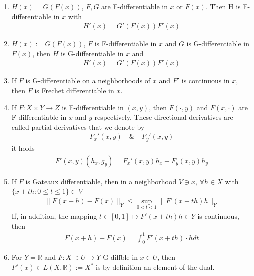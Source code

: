 \begin{enumerate}
	\item $H(x) = G(F(x))$, $F, G$ are F-differentiable in $x$ or $F(x)$. Then H is F-differentiable in $x$ with
		\begin{align*}
			H'(x) = G'(F(x))F'(x)
		\end{align*}
	\item $H(x) := G(F(x))$, $F$ is F-differentiable in $x$ and $G$ is G-differentiable in $F(x)$, then $H$ is G-differentiable in $x$ and 
		\begin{align*}
			H'(x) = G'(F(x)) F'(x)
		\end{align*}
	\item If $F$ is G-differentiable on a neighborhoods of $x$ and $F'$ is continuous in $x$, then $F$ is Frechet differentiable in $x$. 
	\item If $F:X \times Y \rightarrow Z$ is F-differentiable in $(x, y)$, then $F( \cdot, y )$ and $F(x, \cdot)$ are F-differentiable in $x$ and $y$ respectively. These directional derivatives are called partial derivatives that we denote by
		\begin{align*}
			F_x'(x, y) \quad \& \quad F_y'(x, y)
		\end{align*}
		it holds 
		\begin{align*}
			F'(x, y)(h_x, g_y) = F_x'(x, y)h_x + F_y(x, y)h_y
		\end{align*}
	\item If $F$ is Gateaux differentiable, then in a neighborhood $V \ni x$, $\forall h \in X$ with $\{x + th: 0 \le t \le 1\} \subset V$
		\begin{align*}
			\|F(x + h) - F(x)\|_Y \le \sup_{0 < t < 1} \|F'(x + th) h\|_Y
		\end{align*}
		If, in addition, the mapping $t \in [0, 1] \mapsto F'(x + th) h \in Y$ is continuous, then 
		\begin{align*}
			F(x + h) - F(x) = \int_0^1 F'(x + th)\cdot h dt
		\end{align*}
	\item For $Y = \mathbb{R}$ and $F: X \supset U \rightarrow Y$ G-diffble in $x \in U$, then $F'(x) \in L(X, \mathbb{R}):= X^*$ is by definition an element of the dual. 
\end{enumerate}


